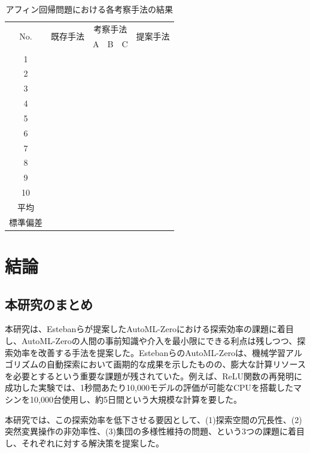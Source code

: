 \documentclass[11pt,oneside,openany,report]{jsbook}
\begin{document}
\begin{table}[tbp]
  \caption{アフィン回帰問題における各考察手法の結果}
  \label{table:exp:result:aggregation:affine_regression}
  \centering
  \begin{tabular}{|c|c|ccc|c|}
    \hline
    \multirow{2}{*}{No. } & \multirow{2}{*}{既存手法} & \multicolumn{3}{|c|}{考察手法} & \multirow{2}{*}{提案手法}  \\
    & & A & B & C & \\
    \hline \hline
    1       &   &  &  &  &  \\
    2       &   &  &  &  &  \\
    3       &   &  &  &  &  \\
    4       &   &  &  &  &  \\
    5       &   &  &  &  &  \\
    6       &   &  &  &  &  \\
    7       &   &  &  &  &  \\
    8       &   &  &  &  &  \\
    9       &   &  &  &  &  \\
    10      &   &  &  &  &  \\
    \hline
    平均 & & & & & \\
    標準偏差 & & & & & \\
    \hline
  \end{tabular}
\end{table}

\chapter{結論} \label{chap:conclusion}

\section{本研究のまとめ}

本研究は、Estebanらが提案したAutoML-Zeroにおける探索効率の課題に着目し、AutoML-Zeroの人間の事前知識や介入を最小限にできる利点は残しつつ、探索効率を改善する手法を提案した。EstebanらのAutoML-Zeroは、機械学習アルゴリズムの自動探索において画期的な成果を示したものの、膨大な計算リソースを必要とするという重要な課題が残されていた。例えば、ReLU関数の再発明に成功した実験では、1秒間あたり10,000モデルの評価が可能なCPUを搭載したマシンを10,000台使用し、約5日間という大規模な計算を要した。

本研究では、この探索効率を低下させる要因として、(1)探索空間の冗長性、(2)突然変異操作の非効率性、(3)集団の多様性維持の問題、という3つの課題に着目し、それぞれに対する解決策を提案した。
\end{document}
